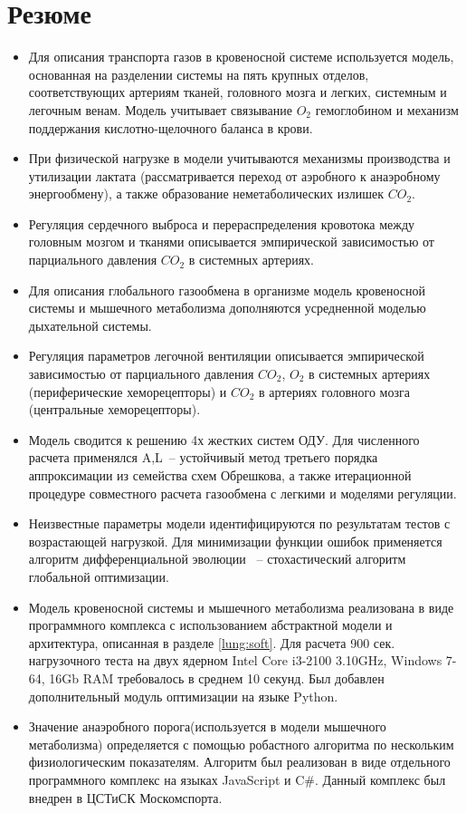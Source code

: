 \section{Резюме}
\begin{itemize}
\item 
Для описания транспорта газов в кровеносной системе используется модель, основанная на разделении системы на пять крупных отделов, соответствующих артериям тканей, головного мозга и легких, системным и легочным венам. Модель учитывает связывание $O_{2}$ гемоглобином и механизм поддержания кислотно-щелочного баланса в крови. 
\item
При физической нагрузке в модели учитываются механизмы производства и утилизации лактата (рассматривается переход от аэробного к анаэробному энергообмену), а также образование неметаболических излишек $CO_{2}$.
\item
Регуляция сердечного выброса и перераспределения кровотока между головным мозгом и тканями описывается эмпирической зависимостью от парциального давления $CO_{2}$ в системных артериях.
\item 
Для описания глобального газообмена в организме модель кровеносной системы и мышечного метаболизма дополняются усредненной моделью дыхательной системы.
\item
Регуляция параметров легочной вентиляции описывается эмпирической зависимостью от парциального давления $CO_{2}$, $O_{2}$ в системных артериях (периферические хеморецепторы) и $CO_{2}$ в артериях головного мозга (центральные хеморецепторы). 
\item
Модель сводится к решению 4х жестких систем ОДУ. Для численного расчета применялся A,L~-- устойчивый метод третьего порядка аппроксимации из семейства схем Обрешкова, а также итерационной процедуре совместного расчета газообмена с легкими и моделями регуляции.
\item
Неизвестные параметры модели идентифицируются по результатам тестов с возрастающей нагрузкой. Для минимизации функции ошибок применяется алгоритм дифференциальной эволюции ~--  стохастический алгоритм глобальной оптимизации.
\item 
Модель кровеносной системы и мышечного метаболизма реализована в виде программного комплекса с использованием абстрактной модели и архитектура, описанная в разделе \ref{lung:soft}. Для расчета 900 сек. нагрузочного теста на двух ядерном Intel Core i3-2100 3.10GHz, Windows 7-64, 16Gb RAM требовалось в среднем 10 секунд. Был добавлен дополнительный модуль оптимизации на языке Python.
\item
Значение анаэробного порога(используется в модели мышечного метаболизма) определяется с помощью робастного алгоритма по нескольким физиологическим показателям. Алгоритм был реализован в виде отдельного программного комплекс на языках JavaScript и C\#. Данный комплекс был внедрен в ЦСТиСК Москомспорта.  

\end{itemize}